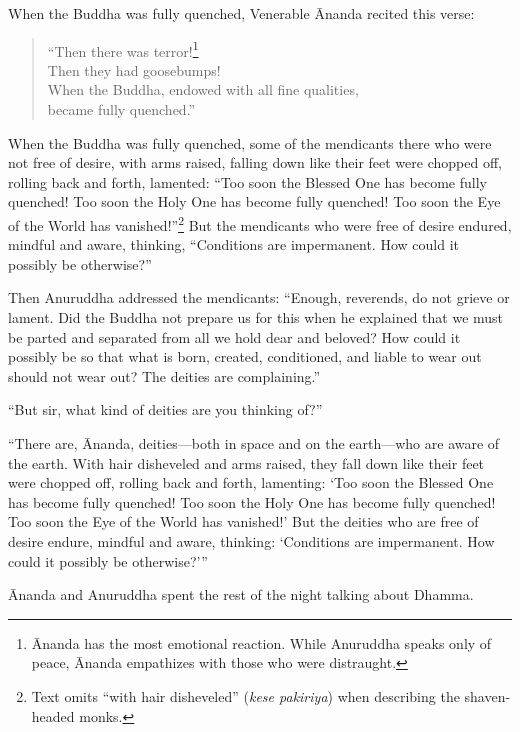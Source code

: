 \documentclass[12pt,openany]{book}%
\begin{document}
When the Buddha was fully quenched, Venerable Ānanda recited this verse: 

\begin{verse}%
“Then there was terror!\footnote{Ānanda has the most emotional reaction. While Anuruddha speaks only of peace, Ānanda empathizes with those who were distraught. } \\
Then they had goosebumps! \\
When the Buddha, endowed with all fine qualities, \\
became fully quenched.” 

%
\end{verse}

When the Buddha was fully quenched, some of the mendicants there who were not free of desire, with arms raised, falling down like their feet were chopped off, rolling back and forth, lamented: “Too soon the Blessed One has become fully quenched! Too soon the Holy One has become fully quenched! Too soon the Eye of the World has vanished!”\footnote{Text omits “with hair disheveled” (\textit{kese pakiriya}) when describing the shaven-headed monks. } But the mendicants who were free of desire endured, mindful and aware, thinking, “Conditions are impermanent. How could it possibly be otherwise?” 

Then Anuruddha addressed the mendicants: “Enough, reverends, do not grieve or lament. Did the Buddha not prepare us for this when he explained that we must be parted and separated from all we hold dear and beloved? How could it possibly be so that what is born, created, conditioned, and liable to wear out should not wear out? The deities are complaining.” 

“But sir, what kind of deities are you thinking of?” 

“There are, Ānanda, deities—both in space and on the earth—who are aware of the earth. With hair disheveled and arms raised, they fall down like their feet were chopped off, rolling back and forth, lamenting: ‘Too soon the Blessed One has become fully quenched! Too soon the Holy One has become fully quenched! Too soon the Eye of the World has vanished!’ But the deities who are free of desire endure, mindful and aware, thinking: ‘Conditions are impermanent. How could it possibly be otherwise?’” 

Ānanda and Anuruddha spent the rest of the night talking about Dhamma. 
\end{document}

